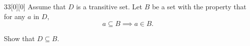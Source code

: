 \documentclass{article}
\begin{document}
\begin{hw}{33}[0][0]
	Assume that $D$ is a transitive set. Let $B$ be a set with the property that for any $a$ in $D$,
	\begin{equation*}
		a \subseteq B \implies a \in B.
	\end{equation*}

	Show that $D \subseteq B$.
\end{hw}
\begin{solution}
	\begin{comment}
		Let us suppose for the sake of contradiction that $B \subset D$.
		
		Now, we note that since $D$ is transitive, it follows then that $\mathscr P D$ is also transitive.
		
		With this in mind, we observe that because $B \subset D$, it must be that $B \in \mathscr P D$.
		
		Then, we note that $B \subseteq \mathscr P D$ by transitivity of $\mathscr P D$.
	\end{comment}
	\begin{comment}
		First, we consider all $a \in D$ such that $a \subseteq B$. Then, for these $a$, we have that $a \in B$ as well by our assumption.
		
		Now, we note that since $D$ is a transitive set, we observe that for all $a' \in a \in D$, we have $a' \in D$ as well. And since $a' \in a$, we see then that as $a \subseteq B$, we have $a' \in a \subseteq B \implies a' \in B$.
		
		From here, let us consider the case where $a \not\subseteq B$. Then, it follows that $B \subset a$. We note then that for all $b \in B$, we have $b \in a \in D \implies b \in D$. In other words, we note that $B \subset D$.
		
		Now, we note that since $B \subset D$, this means then that for all $b \in B$, we have that $b \in D$.
		
		Furthermore, for all $b' \in b$, we have that $b' \in D$.
	\end{comment}
	\begin{comment}
	Suppose for the sake of contradiction that $B \subset D$. Then, we observe that $D \setminus B \neq \emptyset$. Then, by Regularity, we know then that there exists some $a \in (D \setminus B)$ such that $a \cap (D \setminus B) = \emptyset$.
	
	Now, with this in mind, we note that $a \in D$, and thus we have that $a \subseteq D$ by transitivity of $D$.
	

\end{comment}
\end{solution}
\end{document}
